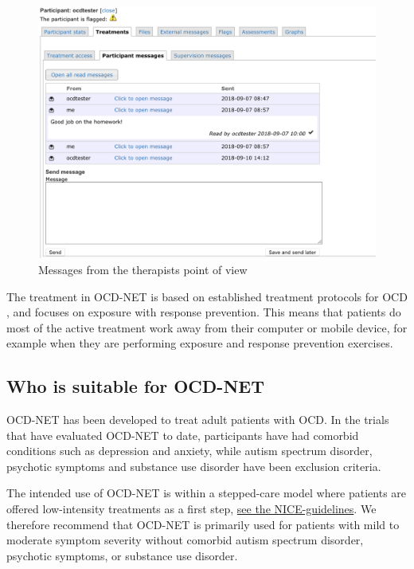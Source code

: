 \documentclass[]{book}
\theoremstyle{definition}
\theoremstyle{definition}
\theoremstyle{definition}
\theoremstyle{remark}
\begin{document}
\begin{figure}
\centering
\includegraphics[width=5.20833in,height=\textheight]{images/therapist-messages.png}
\caption{Messages from the therapists point of view}
\end{figure}

The treatment in OCD-NET is based on established treatment protocols for
OCD \citep{foa2012}, and focuses on exposure with response prevention.
This means that patients do most of the active treatment work away from
their computer or mobile device, for example when they are performing
exposure and response prevention exercises.

\hypertarget{who-is-suitable-for-ocd-net}{%
\subsection{Who is suitable for
OCD-NET}\label{who-is-suitable-for-ocd-net}}

OCD-NET has been developed to treat adult patients with OCD. In the
trials that have evaluated OCD-NET to date, participants have had
comorbid conditions such as depression and anxiety, while autism
spectrum disorder, psychotic symptoms and substance use disorder have
been exclusion criteria.

The intended use of OCD-NET is within a stepped-care model where
patients are offered low-intensity treatments as a first step,
\href{https://www.nice.org.uk/guidance/CG31/chapter/1-Guidance\#stepped-care-for-adults-young-people-and-children-with-ocd-or-bdd}{see
the NICE-guidelines}. We therefore recommend that OCD-NET is primarily
used for patients with mild to moderate symptom severity without
comorbid autism spectrum disorder, psychotic symptoms, or substance use
disorder.
\end{document}
